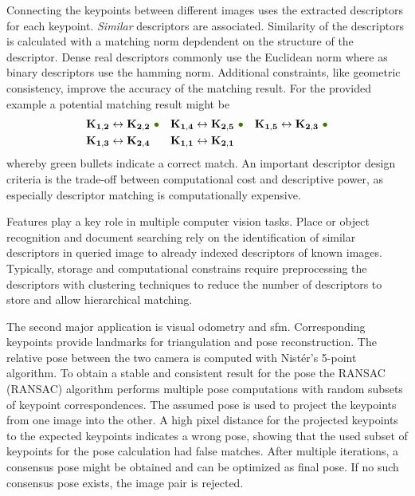 Connecting the keypoints between different images uses the extracted descriptors for each keypoint.
\emph{Similar} descriptors are associated.
Similarity of the descriptors is calculated with a matching norm depdendent on the structure of the descriptor.
Dense real descriptors commonly use the Euclidean norm where as binary descriptors use the hamming norm.
Additional constraints, like geometric consistency, improve the accuracy of the matching result.
For the provided example a potential matching result might be
\begin{equation}
\begin{aligned}
    \mathbf{K_{1,2}} &\leftrightarrow \mathbf{K_{2,2}}~\textcolor{darkgreen}{\bullet} &
    \mathbf{K_{1,4}} &\leftrightarrow \mathbf{K_{2,5}}~\textcolor{darkgreen}{\bullet} &
    \mathbf{K_{1,5}} &\leftrightarrow \mathbf{K_{2,3}}~\textcolor{darkgreen}{\bullet} \\
    \mathbf{K_{1,3}} &\leftrightarrow \mathbf{K_{2,4}} &
    \mathbf{K_{1,1}} &\leftrightarrow \mathbf{K_{2,1}} &
\end{aligned}
\end{equation}
whereby green bullets indicate a correct match.
An important descriptor design criteria is the trade-off between computational cost and descriptive power, as especially descriptor matching is computationally expensive.

Features play a key role in multiple computer vision tasks.
Place or object recognition and document searching rely on the identification of similar descriptors in queried image to already indexed descriptors of known images.
Typically, storage and computational constrains require preprocessing the descriptors with clustering techniques to reduce the number of descriptors to store and allow hierarchical matching.

The second major application is visual odometry and \gls{sfm}.
Corresponding keypoints provide landmarks for triangulation and pose reconstruction.
The relative pose between the two camera is computed with Nistér's 5-point algorithm\cite{nister_ieee2004}.
To obtain a stable and consistent result for the pose the \acrshort{RANSAC} (\acrlong{RANSAC})\cite{fischler_ransac_1980} algorithm performs multiple pose computations with random subsets of keypoint correspondences.
The assumed pose is used to project the keypoints from one image into the other.
A high pixel distance for the projected keypoints to the expected keypoints indicates a wrong pose, showing that the used subset of keypoints for the pose calculation had false matches.
After multiple iterations, a consensus pose might be obtained and can be optimized as final pose.
If no such consensus pose exists, the image pair is rejected.

